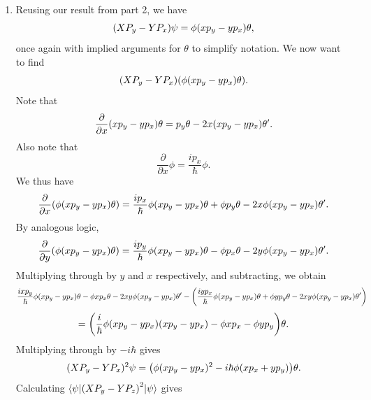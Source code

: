 \documentclass[11pt, letterpaper]{article}
\renewcommand{\left}{\mleft}
\renewcommand{\right}{\mright}
\begin{document}
\begin{enumerate}
\begin{align*}
			&=A^2a \sqrt{\frac{\pi }{2} } \int_{0}^{2\pi }\int_{0}^{\infty }r^2 \theta \left( b^2-r^2 \right) \left( p_y\cos \theta -p_x\sin \theta  \right)  \,\mathrm{d} r \mathrm{d} \theta \\
			&=A^2a\sqrt{\frac{\pi }{2} } \int_{0}^{2\pi }\int_{0}^{\left| b \right| } r^2\left( p_y \cos \theta -p_x \sin \theta  \right)  \,\mathrm{d} r \mathrm{d} \theta \\
			&=A^2 a \sqrt{\frac{\pi }{2} } \int_{0}^{2\pi } \frac{\left| b \right| ^3}{3} \left( p_y \cos \theta - p_x \sin \theta  \right)  \,\mathrm{d} \theta \\
			&=\frac{A^2 a\left| b \right| ^3}{3} \sqrt{\frac{\pi }{2} } p_y(1-1)\\
			&=0
		.\end{align*}
	\item Reusing our result from part 2, we have
		\[
			\left( XP_y-YP_x \right) \psi =\phi \left( xp_y-yp_x \right) \theta
		,\]
		once again with implied arguments for $\theta $ to simplify notation. We now want to find
		\[
			\left( XP_y-YP_x \right) \left( \phi \left( xp_y-yp_x \right) \theta  \right) 
		.\]
		Note that
		\[
			\frac{\partial }{\partial x} \left( xp_y-yp_x \right)\theta =p_y\theta -2x\left( xp_y-yp_x \right) \theta '
		.\]
		Also note that
		\[
			\frac{\partial }{\partial x} \phi =\frac{ip_x}{\hbar } \phi 
		.\]
		We thus have
		\[
			\frac{\partial }{\partial x} \left( \phi \left( xp_y-yp_x \right) \theta  \right) =\frac{ip_x}{\hbar } \phi\left( xp_y-yp_x \right) \theta +\phi p_y\theta -2x\phi \left( xp_y-yp_x \right) \theta '
		.\]
		By analogous logic,
		\[
			\frac{\partial }{\partial y} \left( \phi \left( xp_y-yp_x \right) \theta  \right) =\frac{ip_y}{\hbar } \phi \left( xp_y-yp_x \right) \theta -\phi p_x\theta -2y\phi \left( xp_y-yp_x \right) \theta '
		.\]
		Multiplying through by $y$ and $x$ respectively, and subtracting,  we obtain
		\[
			\frac{ixp_y}{\hbar } \phi \left( xp_y-yp_x \right) \theta -\phi xp_x\theta -2xy\phi \left( xp_y-yp_x \right) \theta '-\left( \frac{iyp_x}{\hbar } \phi \left( xp_y-yp_x \right) \theta +\phi yp_y\theta -2xy\phi \left( xp_y-yp_x \right) \theta ' \right) 
		\]
		\[
			=\left( \frac{i}{\hbar } \phi \left( xp_y-yp_x \right) \left( xp_y-yp_x \right) -\phi xp_x-\phi yp_y \right) \theta 
		.\]
		Multiplying through by $-i\hbar $ gives
		\[
			(XP_y-YP_x)^2\psi =\left( \phi (xp_y-yp_x)^2-i\hbar \phi \left(xp_x+yp_y \right)\right) \theta 
		.\]
		Calculating $\bra{\psi } \left( XP_y-YP_z \right)^2 \ket{\psi } $ gives
		\begin{align*}

\end{align*}
\end{enumerate}
\end{document}
